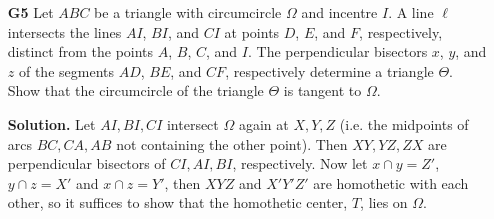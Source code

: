\documentclass[11pt,a4paper]{article}
\begin{document}
\begin{enumerate}
	\item[\textbf{G5}] Let $ABC$ be a triangle with circumcircle $\Omega$ and incentre $I$. A line $\ell$ intersects the lines $AI$, $BI$, and $CI$ at points $D$, $E$, and $F$, respectively, distinct from the points $A$, $B$, $C$, and $I$. The perpendicular bisectors $x$, $y$, and $z$ of the segments $AD$, $BE$, and $CF$, respectively determine a triangle $\Theta$. Show that the circumcircle of the triangle $\Theta$ is tangent to $\Omega$.
	
	\textbf{Solution.} 
	Let $AI, BI, CI$ intersect $\Omega$ again at $X, Y, Z$ (i.e. the midpoints of arcs $BC, CA, AB$ not containing the other point). 
	Then $XY, YZ, ZX$ are perpendicular bisectors of $CI, AI, BI$, respectively. 
	Now let $x\cap y=Z'$, $y\cap z=X'$ and $x\cap z=Y'$, 
	then $XYZ$ and $X'Y'Z'$ are homothetic with each other, 
	so it suffices to show that the homothetic center, $T$, lies on $\Omega$. 
	

\end{enumerate}
\end{document}
